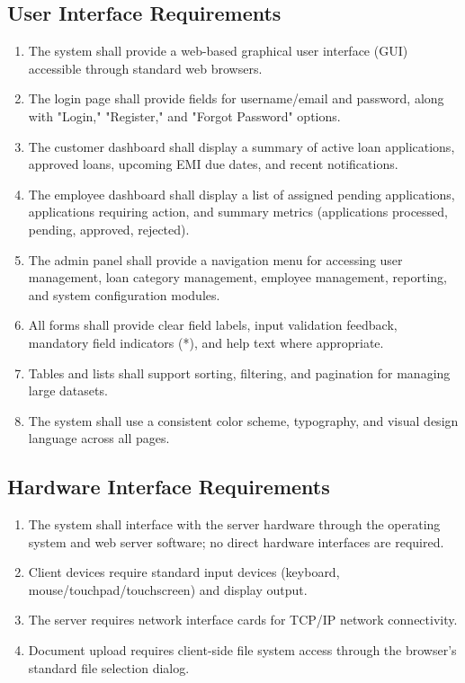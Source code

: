 \subsection{User Interface Requirements}

\begin{enumerate}
  \item The system shall provide a web-based graphical user interface (GUI) accessible through standard web browsers.
  \item The login page shall provide fields for username/email and password, along with "Login," "Register," and "Forgot Password" options.
  \item The customer dashboard shall display a summary of active loan applications, approved loans, upcoming EMI due dates, and recent notifications.
  \item The employee dashboard shall display a list of assigned pending applications, applications requiring action, and summary metrics (applications processed, pending, approved, rejected).
  \item The admin panel shall provide a navigation menu for accessing user management, loan category management, employee management, reporting, and system configuration modules.
  \item All forms shall provide clear field labels, input validation feedback, mandatory field indicators (*), and help text where appropriate.
  \item Tables and lists shall support sorting, filtering, and pagination for managing large datasets.
  \item The system shall use a consistent color scheme, typography, and visual design language across all pages.
\end{enumerate}

\subsection{Hardware Interface Requirements}

\begin{enumerate}
  \item The system shall interface with the server hardware through the operating system and web server software; no direct hardware interfaces are required.
  \item Client devices require standard input devices (keyboard, mouse/touchpad/touchscreen) and display output.
  \item The server requires network interface cards for TCP/IP network connectivity.
  \item Document upload requires client-side file system access through the browser's standard file selection dialog.
\end{enumerate}

